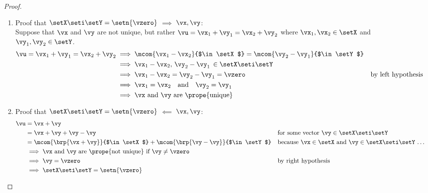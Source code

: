 \begin{proof}
\begin{enumerate}
  \item Proof that $\setX\seti\setY=\setn{\vzero}$ $\implies$  $\vx,\vy$:\\
    Suppose that $\vx$ and $\vy$ are not unique, but rather $\vu=\vx_1+\vy_1=\vx_2+\vy_2$ where
    $\vx_1,\vx_2\in\setX$ and $\vy_1,\vy_2\in\setY$.
    \begin{align*}
      \vu = \vx_1+\vy_1 = \vx_2+\vy_2
        &\implies \mcom{\vx_1-\vx_2}{$\in\setX$} = \mcom{\vy_2-\vy_1}{$\in\setY$}
      \\&\implies {\vx_1-\vx_2},\,{\vy_2-\vy_1}\,\in\setX\seti \setY
      \\&\implies {\vx_1-\vx_2}={\vy_2-\vy_1}=\vzero
        && \text{by left hypothesis}
      \\&\implies {\vx_1=\vx_2} \quad\text{and}\quad {\vy_2=\vy_1}
      \\&\implies \text{$\vx$ and $\vy$ are \prope{unique}}
    \end{align*}

  \item Proof that $\setX\seti\setY=\setn{\vzero}$ $\impliedby$  $\vx,\vy$:
    \begin{align*}
      \vu &= \vx + \vy
        \\&= \vx + \vy + \vy - \vy
          && \text{for some vector $\vy\in\setX\seti\setY$}
        \\&= \mcom{\brp{\vx + \vy}}{$\in\setX$} + \mcom{\brp{\vy - \vy}}{$\in\setY$}
          && \text{because $\vx\in\setX$ and $\vy\in\setX\seti\setY$ \ldots}
        \\&\implies \text{$\vx$ and $\vy$ are \prope{not unique} if $\vy\neq\vzero$}
        \\&\implies \vy=\vzero
          && \text{by right hypothesis}
        \\&\implies \setX\seti\setY=\setn{\vzero}
    \end{align*}
\end{enumerate}
\end{proof}

